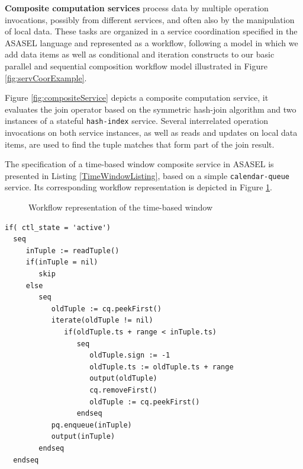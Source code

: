 \textbf{Composite computation services}  process data by multiple operation invocations, possibly from different services, and often also by the manipulation of local data. These tasks are organized in a service coordination specified in the ASASEL language and represented as a workflow, following a model in which we add data items as well as conditional and iteration constructs to our basic parallel and sequential composition workflow model illustrated in Figure \ref{fig:servCoorExample}.
		
Figure \ref{fig:compositeService} depicts a composite computation service, it evaluates the join operator based on the symmetric hash-join algorithm and two instances of a stateful \texttt{hash-index} service. Several interrelated operation invocations on both service instances, as well as reads and updates on local data items, are used to find the tuple matches that form part of the join result.

The specification of a time-based window composite service in ASASEL is presented in Listing \ref{TimeWindowListing}, based on a simple \texttt{calendar-queue} service. Its corresponding workflow representation is depicted in Figure \ref{fig:timeBasedWindowWF}.

	\begin{figure}
   \begin{center}
   \end{center}
   \caption{Workflow representation of the time-based window}
   \label{fig:timeBasedWindowWF}
\end{figure}
		
\lstset{language=AbStM,showstringspaces=false}
\begin{lstlisting}[caption={ASM specification for the time-based window},label=TimeWindowListing]
if( ctl_state = 'active')
  seq
     inTuple := readTuple()
     if(inTuple = nil)
        skip
     else
        seq
           oldTuple := cq.peekFirst()
           iterate(oldTuple != nil)
              if(oldTuple.ts + range < inTuple.ts)
                 seq
                    oldTuple.sign := -1
                    oldTuple.ts := oldTuple.ts + range
                    output(oldTuple)
                    cq.removeFirst()
                    oldTuple := cq.peekFirst()
                 endseq
           pq.enqueue(inTuple)
           output(inTuple)
        endseq
  endseq
\end{lstlisting}





		










